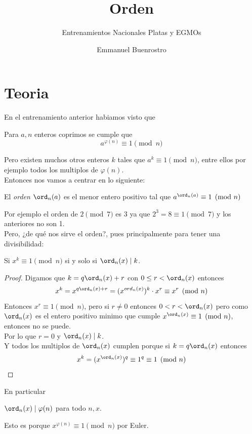 \documentclass[11pt]{scrartcl}
\title {Orden}
\subtitle{Entrenamientos Nacionales Platas y EGMOs}
\author{Emmanuel Buenrostro}
\begin{document}
\maketitle

\section{Teoria}
En el entrenamiento anterior habiamos visto que 
\begin{theorem}
    Para $a,n$ enteros coprimos se cumple que 
    \[a ^{\varphi (n)} \equiv 1 \pmod n \]
\end{theorem}

Pero existen muchos otros enteros $k$ tales que $a^k \equiv 1 \pmod n$, entre ellos por ejemplo todos los multiplos de $\varphi(n)$. \\
Entonces nos vamos a centrar en lo siguiente:
\begin{definition}
   El \textit{orden} $\ord_n (a)$ es el menor entero positivo tal que $a^{\ord_n(a)} \equiv 1 \pmod n$
\end{definition}

Por ejemplo el orden de $2 \pmod 7$ es $3$ ya que $2^3 = 8 \equiv 1 \pmod 7$ y los anteriores no son 1. \\

Pero, ¿de qué nos sirve el orden?, pues principalmente para tener una divisibilidad: 
\begin{theorem}
    Si $x^k \equiv 1 \pmod n$ si y solo si $\ord_n (x) \mid k$.
\end{theorem}
\begin{proof}
    Digamos que $k = q \ord_n(x) +r$ con $0 \leq r < \ord_n(x)$ entonces 
    \[x^k = x^{q\ord_n(x)+r}= (x^{ord_n(x)})^k \cdot x^r \equiv x^r \pmod n\] 
    Entonces $x^r  \equiv 1 \pmod n$, pero si $r \neq 0$ entonces $0 < r < \ord_n(x)$ pero como $\ord_n(x)$ es el entero positivo minimo que cumple $x^{\ord_n(x)}\equiv 1 \pmod n$, entonces no se puede. \\
    Por lo que $r=0$ y $\ord_n(x) \mid k$. \\
    Y todos los multiplos de $\ord_n(x)$ cumplen porque si $k=q\ord_{n}(x)$ entonces 
    \[x^{k}=(x^{\ord_n(x)})^q \equiv 1^q \equiv 1 \pmod n\]
\end{proof}

En particular
\begin{theorem}
    $\ord_n(x) \mid \varphi(n)$ para todo $n,x$.
\end{theorem}
Esto es porque $x^{\varphi(n)}\equiv 1 \pmod n$ por Euler. \\
\end{document}
